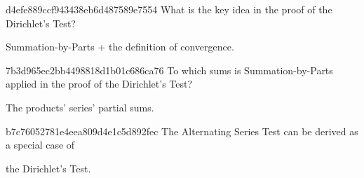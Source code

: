 \begin{note}{d4efe889ccf943438eb6d487589e7554}
    What is the key idea in the proof of the Dirichlet's Test?

    \begin{cloze}{1}
        Summation-by-Parts + the definition of convergence.
    \end{cloze}
\end{note}

\begin{note}{7b3d965ec2bb4498818d1b01c686ca76}
    To which sums is Summation-by-Parts applied in the proof of the Dirichlet's Test?

    \begin{cloze}{1}
        The products' series' partial sums.
    \end{cloze}
\end{note}

\begin{note}{b7c76052781e4eea809d4e1c5d892fec}
    The Alternating Series Test can be derived as a special case of \begin{icloze}{1}the Dirichlet's Test.\end{icloze}
\end{note}


